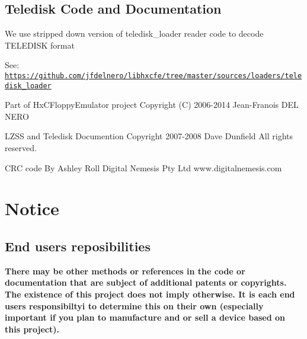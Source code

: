 \subsection*{Teledisk Code and Documentation}


\begin{DoxyItemize}
\item We use stripped down version of teledisk\+\_\+loader reader code to decode T\+E\+L\+E\+D\+I\+SK format
\begin{DoxyItemize}
\item See\+: \href{https://github.com/jfdelnero/libhxcfe/tree/master/sources/loaders/teledisk_loader}{\tt https\+://github.\+com/jfdelnero/libhxcfe/tree/master/sources/loaders/teledisk\+\_\+loader}
\item Part of Hx\+C\+Floppy\+Emulator project Copyright (C) 2006-\/2014 Jean-\/\+Franois D\+EL N\+E\+RO
\end{DoxyItemize}
\item L\+Z\+SS and Teledisk Documention Copyright 2007-\/2008 Dave Dunfield All rights reserved.
\item C\+RC code By Ashley Roll Digital Nemesis Pty Ltd www.\+digitalnemesis.\+com 


\end{DoxyItemize}

\section*{Notice}

\subsection*{End users reposibilities}

{\bfseries There may be other methods or references in the code or documentation that are subject of additional patents or copyrights. The existence of this project does not imply otherwise. It is each end users responsibiltyi to determine this on their own (especially important if you plan to manufacture and or sell a device based on this project).} 